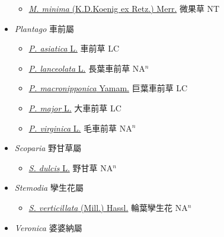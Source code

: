 \begin{itemize}
  \begin{itemize}
        \item[] \href{http://www.theplantlist.org/tpl1.1/search?q=Microcarpaea+minima}{\textit{M. minima} (K.D.Koenig ex Retz.) Merr.}   微果草 NT
  \end{itemize}
 \item[] \textit{Plantago} 車前屬
                    
  \begin{itemize}
        \item[] \href{http://www.theplantlist.org/tpl1.1/search?q=Plantago+asiatica}{\textit{P. asiatica} L.}   車前草 LC
        \item[] \href{http://www.theplantlist.org/tpl1.1/search?q=Plantago+lanceolata}{\textit{P. lanceolata} L.}   長葉車前草 NA$^n$
        \item[] \href{http://www.theplantlist.org/tpl1.1/search?q=Plantago+macronipponica}{\textit{P. macronipponica} Yamam.}   巨葉車前草 LC
        \item[] \href{http://www.theplantlist.org/tpl1.1/search?q=Plantago+major}{\textit{P. major} L.}   大車前草 LC
        \item[] \href{http://www.theplantlist.org/tpl1.1/search?q=Plantago+virginica}{\textit{P. virginica} L.}   毛車前草 NA$^n$
  \end{itemize}
 \item[] \textit{Scoparia} 野甘草屬
                    
  \begin{itemize}
        \item[] \href{http://www.theplantlist.org/tpl1.1/search?q=Scoparia+dulcis}{\textit{S. dulcis} L.}   野甘草 NA$^n$
  \end{itemize}
 \item[] \textit{Stemodia} 孿生花屬
                    
  \begin{itemize}
        \item[] \href{http://www.theplantlist.org/tpl1.1/search?q=Stemodia+verticillata}{\textit{S. verticillata} (Mill.) Hassl.}   輪葉孿生花 NA$^n$
  \end{itemize}
 \item[] \textit{Veronica} 婆婆納屬
                    

\end{itemize}
